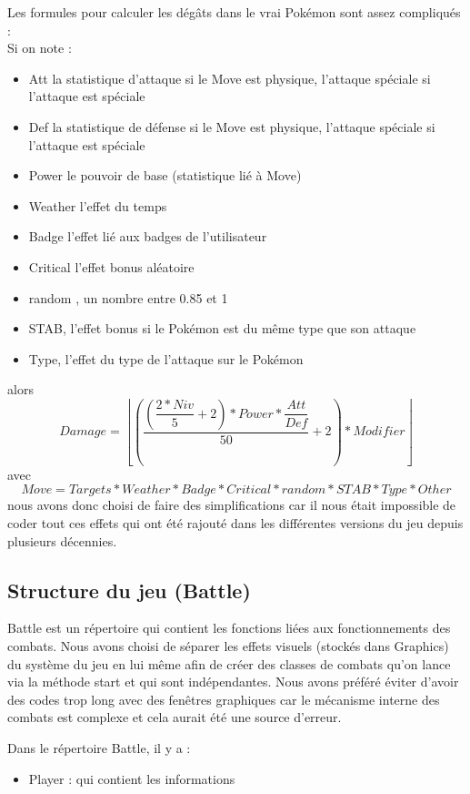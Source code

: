 \documentclass[a4paper,twoside, openany,11pt]{book}
\newcommand{\Floor}[1]{\left\lfloor #1 \right\rfloor}
\begin{document}
Les formules pour calculer les dégâts dans le vrai Pokémon sont assez compliqués :\\
Si on note :
\begin{itemize}
\item Att la statistique d'attaque si le Move est physique, l'attaque spéciale si l'attaque est spéciale
\item Def la statistique de défense si le Move est physique, l'attaque spéciale si l'attaque est spéciale
\item Power le pouvoir de base (statistique lié à Move)
\item Weather l'effet du temps
\item Badge l'effet lié aux badges de l'utilisateur
\item Critical l'effet bonus aléatoire 
\item random , un nombre entre 0.85 et 1
\item STAB, l'effet bonus si le Pokémon est du même type que son attaque
\item Type, l'effet du type de l'attaque sur le Pokémon
\end{itemize}
alors 
\[
Damage = \Floor{\left(\dfrac{\left(\dfrac{2 * Niv}{5} + 2\right) * Power * \dfrac{Att}{Def}}{50} + 2 \right) * Modifier}
\]
avec
\[
Move = Targets * Weather * Badge * Critical * random * STAB * Type * Other
\]
nous avons donc choisi de faire des simplifications car il nous était impossible de coder tout ces effets qui ont été rajouté dans les différentes versions du jeu depuis plusieurs décennies.


\subsection{Structure du jeu (Battle)}
Battle est un répertoire qui contient les fonctions liées aux fonctionnements des combats. Nous avons choisi de séparer les effets visuels (stockés dans Graphics) du système du jeu en lui même afin de créer des classes de combats qu'on lance via la méthode start et qui sont indépendantes. Nous avons préféré éviter d'avoir des codes trop long avec des fenêtres graphiques car le mécanisme interne des combats est complexe et cela aurait été une source d'erreur.

Dans le répertoire Battle, il y a :
\begin{itemize}
\item Player : qui contient les informations 

\end{itemize}
\end{document}
